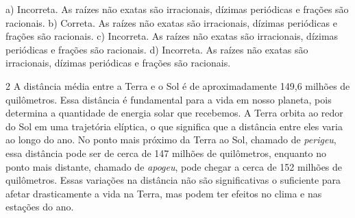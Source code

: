 \begin{escolha}
\begin{boxmedio}
\begin{boxmedio}
{\begin{boxpeq}
\begin{boxpeq}
{\begin{boxpeq}
\begin{boxmedio}
\begin{boxmedio}
\begin{boxpeq}
\begin{boxmedio}
\begin{boxpeq}
\begin{boxpeq}
\begin{boxpeq}
\begin{boxpeq}
\begin{boxmedio}
{\begin{boxmedio}
\begin{boxmedio}
\begin{boxpeq}
\begin{boxmedio}
\begin{boxpeq}
\begin{boxpeq}
\begin{boxpeq}
\begin{escolha}
{\begin{boxmedio}
\begin{boxpeq}
\begin{boxpeq}
\begin{boxpeq}
\begin{boxpeq}
\begin{boxpeq}
\begin{boxmedio}
\begin{boxpeq}
\begin{boxpeq}
\begin{boxpeq}
{\begin{boxpeq}
\begin{boxmedio}
\begin{boxpeq}
\begin{boxpeq}
\begin{boxpeq}
{\begin{boxpeq}
\begin{boxmedio}
{\begin{boxpeq}
\begin{boxpeq}
\begin{boxmedio}
\begin{boxmedio}
\begin{boxpeq}
\begin{boxpeq}
{\begin{boxpeq}
\begin{boxpeq}
\begin{boxpeq}
\begin{boxpeq}
\begin{boxpeq}
\begin{escolha}
\begin{escolha}
{\begin{boxmedio}
\begin{boxpeq}
\begin{q°}
\begin{boxmedio}
\begin{boxpeq}
\begin{boxpeq}
\begin{boxmedio}
\begin{boxmedio}
\begin{boxmedio}
\begin{boxmedio}
{\begin{enumerate}
\begin{boxpeq}
{\begin{boxpeq}
\begin{boxpeq}
\begin{boxmedio}
\begin{boxpeq}
\begin{boxpeq}
\begin{boxpeq}
{a) Incorreta. As raízes não exatas são irracionais, dízimas periódicas
e frações são racionais. 
b) Correta. As raízes não exatas são irracionais, dízimas periódicas
e frações são racionais.
c) Incorreta. As raízes não exatas são irracionais, dízimas periódicas
e frações são racionais. 
d) Incorreta. As raízes não exatas são irracionais, dízimas periódicas
e frações são racionais.} 

\num{2} A distância média entre a Terra e o Sol é de aproximadamente 149,6
milhões de quilômetros. Essa distância é fundamental para a vida em
nosso planeta, pois determina a quantidade de energia solar que
recebemos. A Terra orbita ao redor do Sol em uma trajetória elíptica,
o que significa que a distância entre eles varia ao longo do ano. No
ponto mais próximo da Terra ao Sol, chamado de \textit{perigeu}, essa distância
pode ser de cerca de 147 milhões de quilômetros, enquanto no ponto
mais distante, chamado de \textit{apogeu}, pode chegar a cerca de 152 milhões
de quilômetros. Essas variações na distância não são significativas o
suficiente para afetar drasticamente a vida na Terra, mas podem ter
efeitos no clima e nas estações do ano.


\end{boxpeq}
\end{boxpeq}
\end{boxpeq}
\end{boxmedio}
\end{boxpeq}
\end{boxpeq}}
\end{boxpeq}
\end{enumerate}}
\end{boxmedio}
\end{boxmedio}
\end{boxmedio}
\end{boxmedio}
\end{boxpeq}
\end{boxpeq}
\end{boxmedio}
\end{q°}
\end{boxpeq}
\end{boxmedio}}
\end{escolha}
\end{escolha}
\end{boxpeq}
\end{boxpeq}
\end{boxpeq}
\end{boxpeq}
\end{boxpeq}}
\end{boxpeq}
\end{boxpeq}
\end{boxmedio}
\end{boxmedio}
\end{boxpeq}
\end{boxpeq}}
\end{boxmedio}
\end{boxpeq}}
\end{boxpeq}
\end{boxpeq}
\end{boxpeq}
\end{boxmedio}
\end{boxpeq}}
\end{boxpeq}
\end{boxpeq}
\end{boxpeq}
\end{boxmedio}
\end{boxpeq}
\end{boxpeq}
\end{boxpeq}
\end{boxpeq}
\end{boxpeq}
\end{boxmedio}}
\end{escolha}
\end{boxpeq}
\end{boxpeq}
\end{boxpeq}
\end{boxmedio}
\end{boxpeq}
\end{boxmedio}
\end{boxmedio}}
\end{boxmedio}
\end{boxpeq}
\end{boxpeq}
\end{boxpeq}
\end{boxpeq}
\end{boxmedio}
\end{boxpeq}
\end{boxmedio}
\end{boxmedio}
\end{boxpeq}}
\end{boxpeq}
\end{boxpeq}}
\end{boxmedio}
\end{boxmedio}
\end{escolha}
